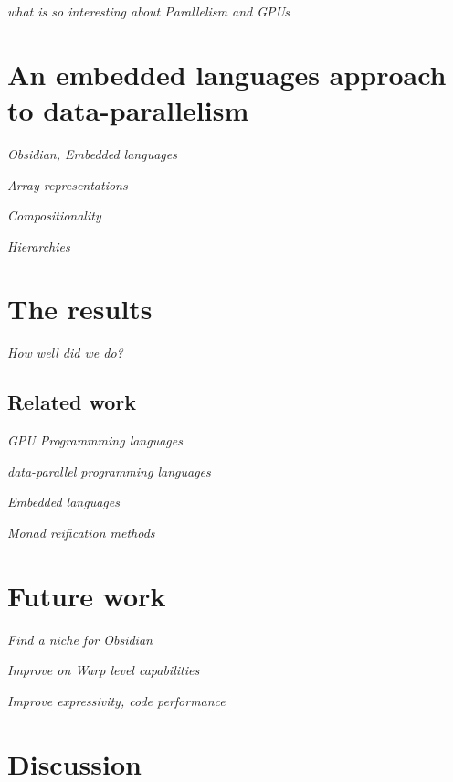 \documentclass[a4paper]{book}
\begin{document}
\emph{what is so interesting about Parallelism and GPUs}

\section{An embedded languages approach to data-parallelism}

\noindent\emph{Obsidian, Embedded languages} 

\noindent\emph{Array representations} 

\noindent\emph{Compositionality} 

\noindent\emph{Hierarchies} 

\section{The results} 

\emph{ How well did we do?} 

\subsection{Related work} 

\noindent\emph{GPU Programmming languages}

\noindent\emph{data-parallel programming languages} 

\noindent\emph{Embedded languages} 

\noindent\emph{Monad reification methods} 


\section{Future work} 

\noindent\emph{Find a niche for Obsidian} 

\noindent\emph{Improve on Warp level capabilities} 

\noindent\emph{Improve expressivity, code performance} 

\section{Discussion} 




\clearpage{}

%
%
\end{document}
